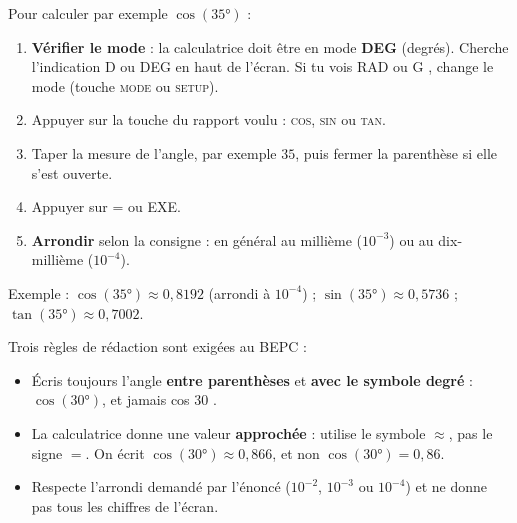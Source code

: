 \documentclass[11pt]{article}
\begin{document}
\begin{methode}
Pour calculer par exemple $\cos(35°)$ :
\begin{enumerate}
\item \textbf{Vérifier le mode} : la calculatrice doit être en mode \textbf{DEG} (degrés). Cherche l'indication \og D \fg{} ou \og DEG \fg{} en haut de l'écran. Si tu vois \og RAD \fg{} ou \og G \fg{}, change le mode (touche \textsc{mode} ou \textsc{setup}).
\item Appuyer sur la touche du rapport voulu : \textsc{cos}, \textsc{sin} ou \textsc{tan}.
\item Taper la mesure de l'angle, par exemple $35$, puis fermer la parenthèse si elle s'est ouverte.
\item Appuyer sur \textsc{=} ou \textsc{EXE}.
\item \textbf{Arrondir} selon la consigne : en général au millième ($10^{-3}$) ou au dix-millième ($10^{-4}$).
\end{enumerate}
Exemple : $\cos(35°) \approx 0,8192$ (arrondi à $10^{-4}$) ; $\sin(35°) \approx 0,5736$ ; $\tan(35°) \approx 0,7002$.
\end{methode}

\begin{attention}
Trois règles de rédaction sont exigées au BEPC :
\begin{itemize}
\item Écris toujours l'angle \textbf{entre parenthèses} et \textbf{avec le symbole degré} : $\cos(30°)$, et jamais \og cos 30 \fg{}.
\item La calculatrice donne une valeur \textbf{approchée} : utilise le symbole $\approx$, pas le signe $=$. On écrit $\cos(30°) \approx 0,866$, et non $\cos(30°) = 0,86$.
\item Respecte l'arrondi demandé par l'énoncé ($10^{-2}$, $10^{-3}$ ou $10^{-4}$) et ne donne pas tous les chiffres de l'écran.
\end{itemize}
\end{attention}
\end{document}
